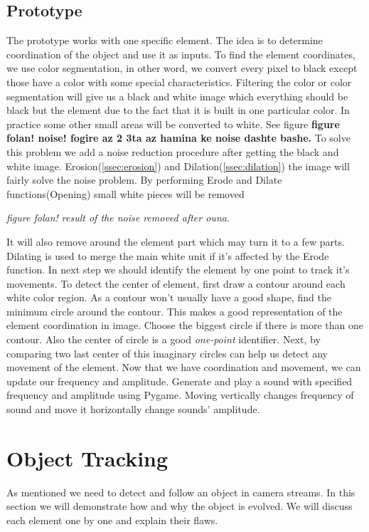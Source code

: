 \documentclass{report}
\begin{document}
\subsection{Prototype}
The prototype works with one specific element. The idea is to determine coordination of the object and use it as inputs. To find the element coordinates, we use color segmentation, in other word, we convert every pixel to black except those have a color with some special characteristics. Filtering the color or color segmentation will give us a black and white image which everything should be black but the element due to the fact that it is built in one particular color. In practice some other small areas will be converted to white. See figure \textbf{figure folan! noise! fogire az 2 3ta az hamina ke noise dashte bashe.} To solve this problem we add a noise reduction procedure after getting the black and white image. Erosion(\ref{ssec:erosion}) and Dilation(\ref{ssec:dilation})  the image will fairly solve the noise problem. By performing Erode and Dilate functions(Opening) small white pieces will be removed

 \textit{figure folan! result of the noise removed after ouna}.
 
  It will also remove around the element part which may turn it to a few parts. Dilating is used to merge the main white unit if it's affected by the Erode function. In next step we should identify the element by one point to track it's movements. To detect the center of element, first draw a contour around each white color region. As a contour won't usually have a good shape, find the minimum circle around the contour. This makes a good representation of the element coordination in image. Choose the biggest circle if there is more than one contour. Also the center of circle is a good \textit{one-point} identifier. \newline
Next, by comparing two last center of this imaginary circles can help us detect any movement of the element. Now that we have coordination and movement, we can update our frequency and amplitude. Generate and play a sound with specified frequency and amplitude using Pygame. Moving vertically changes frequency of sound and move it horizontally change sounds' amplitude.  \newline

\section{Object Tracking}
As mentioned we need to detect and follow an object in camera streams. In this section we will demonstrate how and why the object is evolved. We will discuss each element one by one and explain their flaws.
\end{document}
